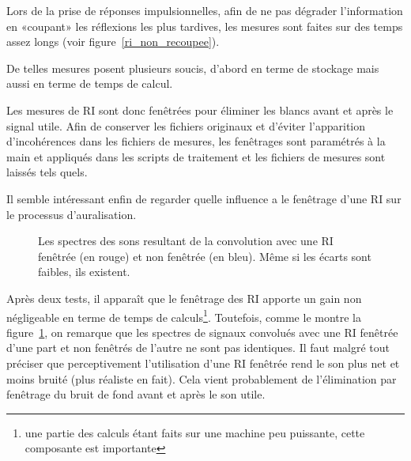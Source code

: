 Lors de la prise de réponses impulsionnelles, afin de ne pas dégrader l'information en «coupant» les réflexions les plus
tardives, les mesures sont faites sur des temps assez longs (voir figure~\ref{ri_non_recoupee}).

De telles mesures posent plusieurs soucis, d'abord en terme de stockage mais aussi en terme de temps de calcul.

Les mesures de RI sont donc fenêtrées pour éliminer les blancs avant et après le signal utile. Afin de conserver les
fichiers originaux et d'éviter l'apparition d'incohérences dans les fichiers de mesures, les fenêtrages sont paramétrés
à la main et appliqués dans les scripts de traitement et les fichiers de mesures sont laissés tels quels.

Il semble intéressant enfin de regarder quelle influence a le fenêtrage d'une RI sur le processus d'auralisation.

\begin{figure}[h!]
\caption{\label{spectres_recoupage}Les spectres des sons resultant de la convolution avec une RI fenêtrée (en rouge) et
non fenêtrée (en bleu). Même si les écarts sont faibles, ils existent.}
\end{figure}


\newpage %

Après deux tests, il apparaît que le fenêtrage des RI apporte un gain non négligeable en terme de temps de
calculs\footnote{une partie des calculs étant faits sur une machine peu puissante, cette composante est importante}.
Toutefois, comme le montre la figure~\ref{spectres_recoupage}, on remarque que les spectres de signaux convolués avec
une RI fenêtrée d'une part et non fenêtrés de l'autre ne sont pas identiques. Il faut malgré tout préciser que
perceptivement l'utilisation d'une RI fenêtrée rend le son plus net et moins bruité (plus réaliste en fait). Cela vient
probablement de l'élimination par fenêtrage du bruit de fond avant et après le son utile.

